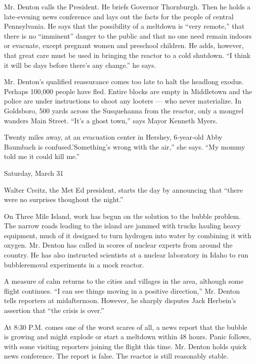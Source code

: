 Mr. Denton calls the President. He briefs Governor Thornburgh. Then he
holds a late‐evening news conference and lays out the facts for the
people of central Pennsylvania. He says that the possibility of a
meltdown is ``very remote,'' that there is no ``imminent'' danger to the
public and that no one need remain indoors or evacuate, except pregnant
women and preschool children. He adds, however, that great care must be
used in bringing the reactor to a cold shutdown. ``I think it will be
days before there's any change.'' he says.

Mr. Denton's qualified reassurance comes too late to halt the headlong
exodus. Perhaps 100,000 people have fled. Entire blocks are empty in
Middletown and the police are under instructions to shoot any looters
--- who never materialize. In Goldsboro, 500 yards across the
Susquehanna from the reactor, only a mongrel wanders Main Street. ``It's
a ghost town,'' says Mayor Kenneth Myers.

Twenty miles away, at an evacuation center in Hershey, 6‐year‐old Abby
Baumbach is confused.'Something's wrong with the air,'' she says. ``My
mommy told me it could kill me.''

Saturday, March 31

Walter Creitz, the Met Ed president, starts the day by announcing that
``there were no surprises thoughout the night.''

On Three Mile Island, work has begun on the solution to the bubble
problem. The narrow roads leading to the island are jammed with trucks
hauling heavy equipment, much of it designed to turn hydrogen into water
by combining it with oxygen. Mr. Denton has called in scores of nuclear
experts from around the country. He has also instructed scientists at a
nuclear laboratory in Idaho to run bubbleremoval experiments in a mock
reactor.

A measure of calm returns to the cities and villages in the area,
although some flight continues. ``I can see things moving in a positive
direction,'' Mr. Denton tells reporters at midafternoon. However, he
sharply disputes Jack Herbein's assertion that ``the crisis is over.''

At 8:30 P.M. comes one of the worst scares of all, a news report that
the bubble is growing and might explode or start a meltdown within 48
hours. Panic follows, with some visiting reporters joining the flight
this time. Mr. Denton holds quick news conference. The report is false.
The reactor is still reasonably stable.

